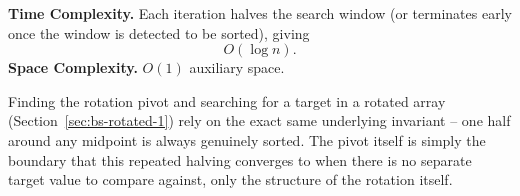 \begin{complexitybox}
\textbf{Time Complexity.} Each iteration halves the search window (or
terminates early once the window is detected to be sorted), giving
\[
  O(\log n).
\]
\textbf{Space Complexity.} $O(1)$ auxiliary space.
\end{complexitybox}

\begin{takeawaybox}
Finding the rotation pivot and searching for a target in a rotated array
(Section~\ref{sec:bs-rotated-1}) rely on the exact same underlying
invariant -- one half around any midpoint is always genuinely sorted. The
pivot itself is simply the boundary that this repeated halving converges
to when there is no separate target value to compare against, only the
structure of the rotation itself.
\end{takeawaybox}
